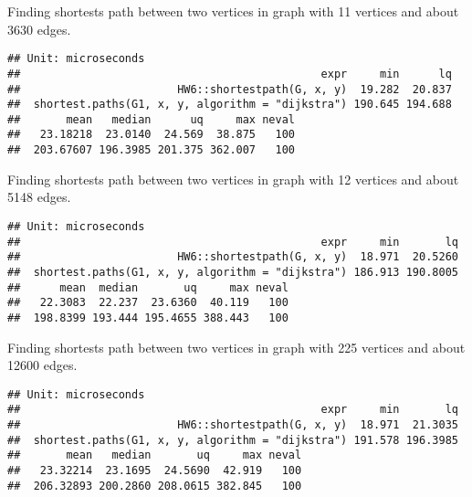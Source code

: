 \documentclass[pdftex,12pt]{article}\usepackage[]{graphicx}\usepackage[]{color}
\makeatletter
\newenvironment{kframe}{%
 \def\at@end@of@kframe{}%
 \ifinner\ifhmode%
  \def\at@end@of@kframe{\end{minipage}}%
  \begin{minipage}{\columnwidth}%
 \fi\fi%
 \def\FrameCommand##1{\hskip\@totalleftmargin \hskip-\fboxsep
 \colorbox{shadecolor}{##1}\hskip-\fboxsep
     \hskip-\linewidth \hskip-\@totalleftmargin \hskip\columnwidth}%
 \MakeFramed {\advance\hsize-\width
   \@totalleftmargin\z@ \linewidth\hsize
   \@setminipage}}%
 {\par\unskip\endMakeFramed%
 \at@end@of@kframe}
\newenvironment{knitrout}{}{} %
\makeatother
\begin{document}
Finding shortests path between two vertices in graph with 11 vertices and about 3630 edges.
\begin{knitrout}
\color{fgcolor}\begin{kframe}
\begin{verbatim}
## Unit: microseconds
##                                              expr     min      lq
##                        HW6::shortestpath(G, x, y)  19.282  20.837
##  shortest.paths(G1, x, y, algorithm = "dijkstra") 190.645 194.688
##       mean   median      uq     max neval
##   23.18218  23.0140  24.569  38.875   100
##  203.67607 196.3985 201.375 362.007   100
\end{verbatim}
\end{kframe}
\end{knitrout}
Finding shortests path between two vertices in graph with 12 vertices and about 5148 edges.
\begin{knitrout}
\color{fgcolor}\begin{kframe}
\begin{verbatim}
## Unit: microseconds
##                                              expr     min       lq
##                        HW6::shortestpath(G, x, y)  18.971  20.5260
##  shortest.paths(G1, x, y, algorithm = "dijkstra") 186.913 190.8005
##      mean  median       uq     max neval
##   22.3083  22.237  23.6360  40.119   100
##  198.8399 193.444 195.4655 388.443   100
\end{verbatim}
\end{kframe}
\end{knitrout}
Finding shortests path between two vertices in graph with 225 vertices and about 12600 edges.
\begin{knitrout}
\color{fgcolor}\begin{kframe}
\begin{verbatim}
## Unit: microseconds
##                                              expr     min       lq
##                        HW6::shortestpath(G, x, y)  18.971  21.3035
##  shortest.paths(G1, x, y, algorithm = "dijkstra") 191.578 196.3985
##       mean   median       uq     max neval
##   23.32214  23.1695  24.5690  42.919   100
##  206.32893 200.2860 208.0615 382.845   100
\end{verbatim}
\end{kframe}
\end{knitrout}
\end{document}
